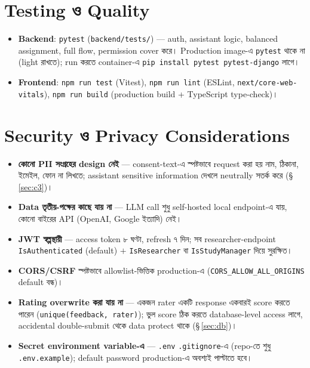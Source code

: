 \documentclass[11pt,a4paper]{article}
\newcommand{\code}[1]{\texttt{\small #1}}
\newcommand{\file}[1]{\texttt{\small #1}}
\begin{document}
\newpage
\section{Testing ও Quality}

\begin{itemize}
\item \textbf{Backend}: \code{pytest} (\file{backend/tests/}) --- auth, assistant logic,
  balanced assignment, full flow, permission cover করে। Production image-এ \code{pytest}
  থাকে না (light রাখতে); run করতে container-এ \code{pip install pytest pytest-django} লাগে।
\item \textbf{Frontend}: \code{npm run test} (Vitest), \code{npm run lint} (ESLint,
  \code{next/core-web-vitals}), \code{npm run build} (production build \;+\; TypeScript
  type-check)।
\end{itemize}

\newpage
\section{Security ও Privacy Considerations}
\label{sec:security}

\begin{itemize}
\item \textbf{কোনো PII সংগ্রহের design নেই} --- consent-text-এ স্পষ্টভাবে request করা হয়
  নাম, ঠিকানা, ইমেইল, ফোন না লিখতে; assistant sensitive information দেখলে neutrally সতর্ক
  করে (\S\,\ref{sec:c3})।
\item \textbf{Data তৃতীয়-পক্ষের কাছে যায় না} --- LLM call শুধু self-hosted local
  endpoint-এ যায়, কোনো বাইরের API (OpenAI, Google ইত্যাদি) নেই।
\item \textbf{JWT স্বল্পস্থায়ী} --- access token ৮ ঘণ্টা, refresh ৭ দিন; সব researcher-endpoint
  \code{IsAuthenticated} (default) $+$ \code{IsResearcher} বা \code{IsStudyManager} দিয়ে
  সুরক্ষিত।
\item \textbf{CORS/CSRF} স্পষ্টভাবে allowlist-ভিত্তিক production-এ (\code{CORS\_ALLOW\_ALL\_ORIGINS}
  default বন্ধ)।
\item \textbf{Rating overwrite করা যায় না} --- একজন rater একটি response একবারই score করতে
  পারেন (\code{unique(feedback, rater)}); ভুল score ঠিক করতে database-level access লাগে,
  accidental double-submit থেকে data protect থাকে (\S\,\ref{sec:db})।
\item \textbf{Secret environment variable-এ} --- \file{.env} \code{.gitignore}-এ (repo-তে
  শুধু \file{.env.example}); default password production-এ অবশ্যই পাল্টাতে হবে।
\end{itemize}
\end{document}
